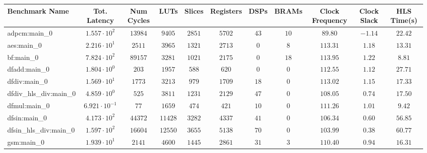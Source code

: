 \begin{tabular}{|l|c|c|c|c|c|c|c|c|c|c|}
\hline
Benchmark Name          & Tot. Latency            & Num Cycles & LUTs      & Slices    & Registers & DSPs    & BRAMs   & Clock Frequency & Clock Slack & HLS Time(s) \\
\hline
adpcm:main\_0           & $ 1.557 \cdot 10^{2}  $ & $ 13984  $ & $ 9405  $ & $ 2851  $ & $ 5702  $ & $ 43  $ & $ 10  $ & $ 89.80       $ & $ -1.14   $ & $ 22.42   $ \\
aes:main\_0             & $ 2.216 \cdot 10^{1}  $ & $ 2511   $ & $ 3965  $ & $ 1321  $ & $ 2713  $ & $ 0   $ & $ 8   $ & $ 113.31      $ & $ 1.18    $ & $ 13.31   $ \\
bf:main\_0              & $ 7.824 \cdot 10^{2}  $ & $ 89157  $ & $ 3281  $ & $ 1021  $ & $ 2175  $ & $ 0   $ & $ 18  $ & $ 113.95      $ & $ 1.22    $ & $ 8.81    $ \\
dfadd:main\_0           & $ 1.804 \cdot 10^{0}  $ & $ 203    $ & $ 1957  $ & $ 588   $ & $ 620   $ & $ 0   $ & $ 0   $ & $ 112.55      $ & $ 1.12    $ & $ 27.71   $ \\
dfdiv:main\_0           & $ 1.569 \cdot 10^{1}  $ & $ 1773   $ & $ 3213  $ & $ 979   $ & $ 1709  $ & $ 18  $ & $ 0   $ & $ 113.02      $ & $ 1.15    $ & $ 17.33   $ \\
dfdiv\_hls\_div:main\_0 & $ 4.859 \cdot 10^{0}  $ & $ 525    $ & $ 3811  $ & $ 1231  $ & $ 2129  $ & $ 47  $ & $ 0   $ & $ 108.05      $ & $ 0.74    $ & $ 17.50   $ \\
dfmul:main\_0           & $ 6.921 \cdot 10^{-1} $ & $ 77     $ & $ 1659  $ & $ 474   $ & $ 421   $ & $ 10  $ & $ 0   $ & $ 111.26      $ & $ 1.01    $ & $ 9.42    $ \\
dfsin:main\_0           & $ 4.173 \cdot 10^{2}  $ & $ 44372  $ & $ 11428 $ & $ 3282  $ & $ 4337  $ & $ 41  $ & $ 0   $ & $ 106.34      $ & $ 0.60    $ & $ 56.85   $ \\
dfsin\_hls\_div:main\_0 & $ 1.597 \cdot 10^{2}  $ & $ 16604  $ & $ 12550 $ & $ 3655  $ & $ 5138  $ & $ 70  $ & $ 0   $ & $ 103.99      $ & $ 0.38    $ & $ 60.77   $ \\
gsm:main\_0             & $ 1.939 \cdot 10^{1}  $ & $ 2141   $ & $ 4600  $ & $ 1445  $ & $ 2861  $ & $ 31  $ & $ 3   $ & $ 110.40      $ & $ 0.94    $ & $ 16.31   $ \\

\end{tabular}
